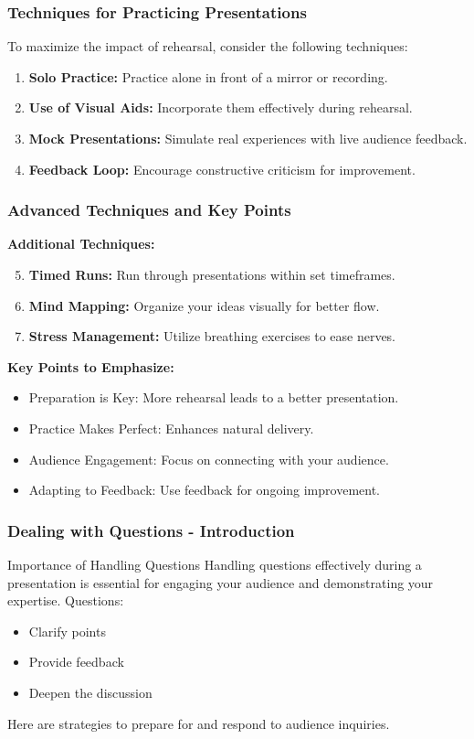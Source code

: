 \documentclass[aspectratio=169]{beamer}
\begin{document}
\begin{frame}[fragile]
    \frametitle{Techniques for Practicing Presentations}
    To maximize the impact of rehearsal, consider the following techniques:
    \begin{enumerate}
        \item \textbf{Solo Practice:} Practice alone in front of a mirror or recording.
        \item \textbf{Use of Visual Aids:} Incorporate them effectively during rehearsal.
        \item \textbf{Mock Presentations:} Simulate real experiences with live audience feedback.
        \item \textbf{Feedback Loop:} Encourage constructive criticism for improvement.
    \end{enumerate}
\end{frame}

\begin{frame}[fragile]
    \frametitle{Advanced Techniques and Key Points}
    \textbf{Additional Techniques:}
    \begin{enumerate}
        \setcounter{enumi}{4} %
        \item \textbf{Timed Runs:} Run through presentations within set timeframes.
        \item \textbf{Mind Mapping:} Organize your ideas visually for better flow.
        \item \textbf{Stress Management:} Utilize breathing exercises to ease nerves.
    \end{enumerate}
    
    \textbf{Key Points to Emphasize:}
    \begin{itemize}
        \item Preparation is Key: More rehearsal leads to a better presentation.
        \item Practice Makes Perfect: Enhances natural delivery.
        \item Audience Engagement: Focus on connecting with your audience.
        \item Adapting to Feedback: Use feedback for ongoing improvement.
    \end{itemize}
\end{frame}

\begin{frame}[fragile]
    \frametitle{Dealing with Questions - Introduction}
    \begin{block}{Importance of Handling Questions}
        Handling questions effectively during a presentation is essential for engaging your audience and demonstrating your expertise. Questions:
        \begin{itemize}
            \item Clarify points
            \item Provide feedback
            \item Deepen the discussion
        \end{itemize}
    \end{block}
    Here are strategies to prepare for and respond to audience inquiries.
\end{frame}
\end{document}
